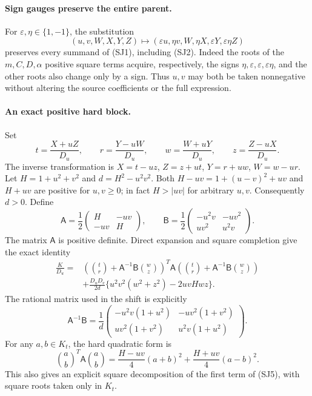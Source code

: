 \paragraph{Sign gauges preserve the entire parent.}
For $\varepsilon,\eta\in\{1,-1\}$, the substitution
\[
 (u,v,W,X,Y,Z)\longmapsto
 (\varepsilon u,\eta v,W,\eta X,\varepsilon Y,
  \varepsilon\eta Z)                                      \tag{SJ3}
\]
preserves every summand of (SJ1), including (SJ2).  Indeed the roots of the
$m,C,D,\alpha$ positive square terms acquire, respectively, the signs
$\eta,\varepsilon,\varepsilon,\varepsilon\eta$, and the other roots also
change only by a sign.  Thus $u,v$ may both be taken nonnegative without
altering the source coefficients or the full expression.

\paragraph{An exact positive hard block.}
Set
\[
 t=\frac{X+uZ}{D_u},\qquad r=\frac{Y-uW}{D_u},\qquad
 w=\frac{W+uY}{D_u},\qquad z=\frac{Z-uX}{D_u}.             \tag{SJ4}
\]
The inverse transformation is
$X=t-uz$, $Z=z+ut$, $Y=r+uw$, $W=w-ur$.
Let $H=1+u^2+v^2$ and $d=H^2-u^2v^2$.  Both
$H-uv=1+(u-v)^2+uv$ and $H+uv$ are positive for $u,v\geq0$;
in fact $H>|uv|$ for arbitrary $u,v$.  Consequently $d>0$.
Define
\[
 \mathsf A=\frac12\begin{pmatrix}H&-uv\\-uv&H\end{pmatrix},\qquad
 \mathsf B=\frac12\begin{pmatrix}-u^2v&-uv^2\\uv^2&u^2v\end{pmatrix}.
\]
The matrix $\mathsf A$ is positive definite.  Direct expansion and square
completion give the exact identity
\begin{align}
 \frac K{D_u}
 ={}&\left(\binom tr+\mathsf A^{-1}\mathsf B\binom wz\right)^{\!T}
       \mathsf A
       \left(\binom tr+\mathsf A^{-1}\mathsf B\binom wz\right)\\
    &+\frac{D_uD_v}{2d}
       \{u^2v^2(w^2+z^2)-2uvH wz\}.                    \tag{SJ5}
\end{align}
The rational matrix used in the shift is explicitly
\[
 \mathsf A^{-1}\mathsf B=
 \frac1d\begin{pmatrix}
 -u^2v(1+u^2)&-uv^2(1+v^2)\\
 uv^2(1+v^2)&u^2v(1+u^2)
 \end{pmatrix}.                                         \tag{SJ6}
\]
For any $a,b\in K_t$, the hard quadratic form is
\[
 \binom{a}{b}^{\!T}\mathsf A\binom{a}{b}
   =\frac{H-uv}{4}(a+b)^2+\frac{H+uv}{4}(a-b)^2.         \tag{SJ7}
\]
This also gives an explicit square decomposition of the first term of
(SJ5), with square roots taken only in $K_t$.

